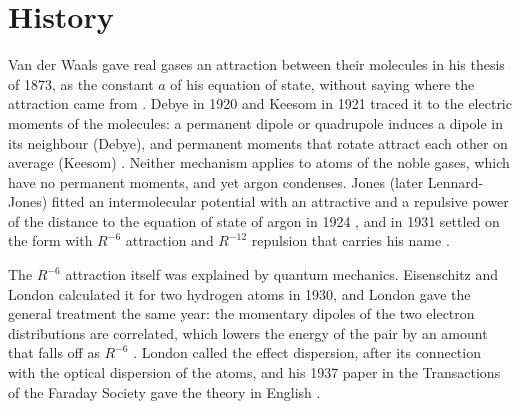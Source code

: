 \section{History}
Van der Waals gave real gases an attraction between their molecules in his thesis of 1873, as the constant $a$ of his equation of state, without saying where the attraction came from \cite{vanderwaals1873}. Debye in 1920 and Keesom in 1921 traced it to the electric moments of the molecules: a permanent dipole or quadrupole induces a dipole in its neighbour (Debye), and permanent moments that rotate attract each other on average (Keesom) \cite{debye1920,keesom1921}. Neither mechanism applies to atoms of the noble gases, which have no permanent moments, and yet argon condenses. Jones (later Lennard-Jones) fitted an intermolecular potential with an attractive and a repulsive power of the distance to the equation of state of argon in 1924 \cite{jones1924}, and in 1931 settled on the form with $R^{-6}$ attraction and $R^{-12}$ repulsion that carries his name \cite{lennardjones1931}.

The $R^{-6}$ attraction itself was explained by quantum mechanics. Eisenschitz and London calculated it for two hydrogen atoms in 1930, and London gave the general treatment the same year: the momentary dipoles of the two electron distributions are correlated, which lowers the energy of the pair by an amount that falls off as $R^{-6}$ \cite{eisenschitz1930,london1930}. London called the effect dispersion, after its connection with the optical dispersion of the atoms, and his 1937 paper in the Transactions of the Faraday Society gave the theory in English \cite{london1937}.
